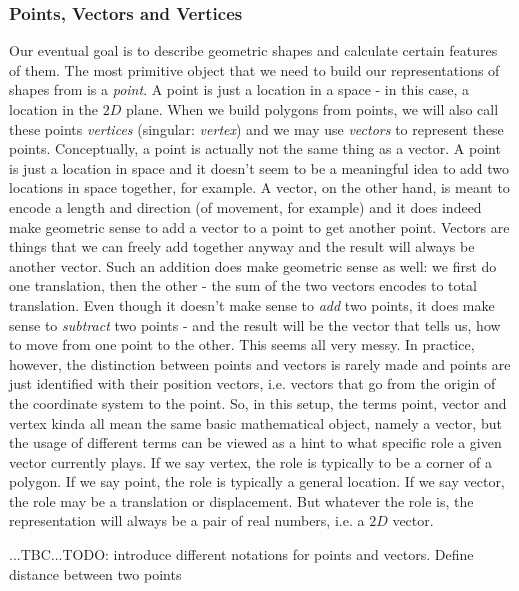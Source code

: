 \subsubsection{Points, Vectors and Vertices}
Our eventual goal is to describe geometric shapes and calculate certain features of them. The most primitive object that we need to build our representations of shapes from is a \emph{point}. A point is just a location in a space - in this case, a location in the $2D$ plane. When we build polygons from points, we will also call these points \emph{vertices} (singular: \emph{vertex}) and we may use \emph{vectors} to represent these points. Conceptually, a point is actually not the same thing as a vector. A point is just a location in space and it doesn't seem to be a meaningful idea to add two locations in space together, for example. A vector, on the other hand, is meant to encode a length and direction (of movement, for example) and it does indeed make geometric sense to add a vector to a point to get another point. Vectors are things that we can freely add together anyway and the result will always be another vector. Such an addition does make geometric sense as well: we first do one translation, then the other - the sum of the two vectors encodes to total translation. Even though it doesn't make sense to \emph{add} two points, it does make sense to \emph{subtract} two points - and the result will be the vector that tells us, how to move from one point to the other. This seems all very messy. In practice, however, the distinction between points and vectors is rarely made and points are just identified with their position vectors, i.e. vectors that go from the origin of the coordinate system to the point. So, in this setup, the terms point, vector and vertex kinda all mean the same basic mathematical object, namely a vector, but the usage of different terms can be viewed as a hint to what specific role a given vector currently plays. If we say vertex, the role is typically to be a corner of a polygon. If we say point, the role is typically a general location. If we say vector, the role may be a translation or displacement. But whatever the role is, the representation will always be a pair of real numbers, i.e. a $2D$ vector.

...TBC...TODO: introduce different notations for points and vectors. Define distance between two points


